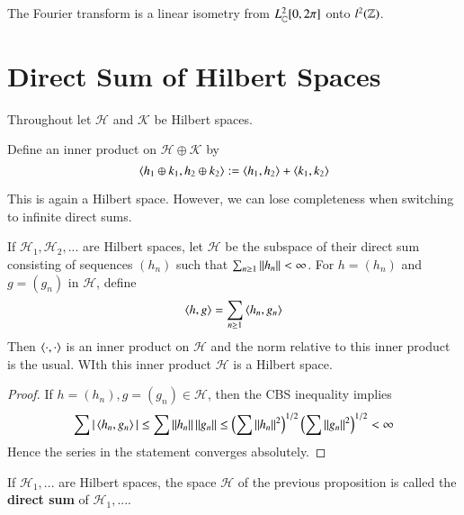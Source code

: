 \begin{thm}
    The Fourier transform is a linear isometry from $L_{\mathbb C}^2[0,2\pi]$ onto $l^2(\mathbb Z)$.
\end{thm}


\section{Direct Sum of Hilbert Spaces}
\label{sec:DirSum}

Throughout let $\mathscr{H}$ and $\mathscr{K}$ be Hilbert spaces.

\begin{defn}
    Define an inner product on $\mathscr{H}\oplus \mathscr{K}$ by $$\left\langle h_1\oplus k_1, h_2 \oplus k_2\right\rangle := \left\langle h_1, h_2\right\rangle+\left\langle k_1, k_2\right\rangle$$
\end{defn}

This is again a Hilbert space. However, we can lose completeness when switching to infinite direct sums.

\begin{prop}
    If $\mathscr{H}_1,\mathscr{H}_2,...$ are Hilbert spaces, let $\mathscr{H}$ be the subspace of their direct sum consisting of sequences $(h_n)$ such that $\sum_{n\geq 1}\left|\left| h_n\right|\right| < \infty$. For $h = (h_n)$ and $g = (g_n)$ in $\mathscr{H}$, define $$\left\langle h, g\right\rangle = \sum_{n\geq 1}\left\langle h_n, g_n\right\rangle$$
    Then $\left\langle \cdot, \cdot\right\rangle$ is an inner product on $\mathscr{H}$ and the norm relative to this inner product is the usual. WIth this inner product $\mathscr{H}$ is a Hilbert space.
\end{prop}
\begin{proof}
    If $h = (h_n),g=(g_n) \in \mathscr{H}$, then the CBS inequality implies $$\sum|\left\langle h_n, g_n\right\rangle| \leq \sum\left|\left| h_n\right|\right|\left|\left| g_n\right|\right| \leq \left(\sum\left|\left| h_n\right|\right|^2\right)^{1/2}\left(\sum\left|\left| g_n\right|\right|^2\right)^{1/2} < \infty$$
    Hence the series in the statement converges absolutely.
\end{proof}



\begin{defn}
    If $\mathscr{H}_1,...$ are Hilbert spaces, the space $\mathscr{H}$ of the previous proposition is called the \textbf{direct sum} of $\mathscr{H}_1,...$.
\end{defn}

%
%
%


